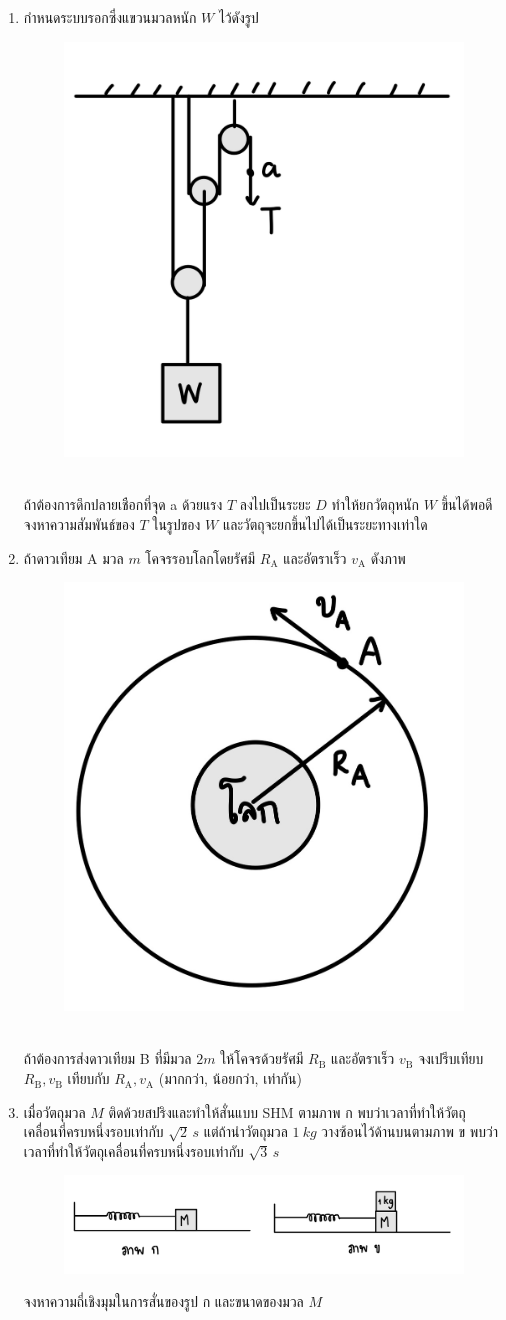 \documentclass[a4paper,12pt]{article}
\begin{document}
\begin{enumerate}
		\item กำหนดระบบรอกซึ่งแขวนมวลหนัก \(W\) ไว้ดังรูป
		\begin{figure}[h]
			\centering
			\includegraphics[width=0.3\linewidth]{6}
		\end{figure}\\
	ถ้าต้องการดึกปลายเชือกที่จุด a ด้วยแรง \(T\) ลงไปเป็นระยะ \(D\) ทำให้ยกวัตถุหนัก \(W\) ขึ้นได้พอดี จงหาความสัมพันธ์ของ \(T\) ในรูปของ \(W\) และวัตถุจะยกขึ้นไปได้เป็นระยะทางเท่าใด
			\vspace{4cm}
		
		\item ถ้าดาวเทียม A มวล \(m\) โคจรรอบโลกโดยรัศมี \(R_\text{A}\) และอัตราเร็ว \(v_\text{A}\) ดังภาพ
		\begin{figure}[h]
			\centering
			\includegraphics[width=0.3\linewidth]{7}
		\end{figure}\\
	ถ้าต้องการส่งดาวเทียม B ที่มีมวล \(2m\) ให้โคจรด้วยรัศมี \(R_\text{B}\) และอัตราเร็ว \(v_\text{B}\) จงเปรีบเทียบ \(R_\text{B},v_\text{B}\) เทียบกับ \(R_\text{A},v_\text{A}\) (มากกว่า, น้อยกว่า, เท่ากัน\textenglish{)}
			\vspace{4cm}
		
		\item เมื่อวัตถุมวล \(M\) ติดด้วยสปริงและทำให้สั่นแบบ SHM ตามภาพ ก พบว่าเวลาที่ทำให้วัตถุเคลื่อนที่ครบหนึ่งรอบเท่ากับ \(\sqrt{2}\,\si{s}\) แต่ถ้านำวัตถุมวล \(\SI{1}{kg}\) วางซ้อนไว้ด้านบนตามภาพ ข พบว่าเวลาที่ทำให้วัตถุเคลื่อนที่ครบหนึ่งรอบเท่ากับ \(\sqrt{3}\,\si{s}\) 
		\begin{figure}[h]
			\centering
			\includegraphics[width=0.9\linewidth]{8}
		\end{figure}
	จงหาความถี่เชิงมุมในการสั่นของรูป ก และขนาดของมวล \(M\)
			\vspace{4cm}
		

\end{enumerate}
\end{document}
